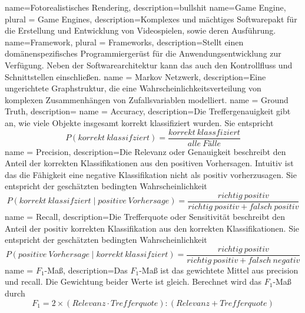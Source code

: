 {
  name=Fotorealistisches Rendering,
  description={bullshit}
}
{
  name=Game Engine,
  plural = {Game Engines},
  description={Komplexes und mächtiges Softwarepakt für die Erstellung und Entwicklung von Videospielen, sowie deren Ausführung.}
}
{
  name=Framework,
  plural = {Frameworks},
  description={Stellt einen domänenspezifisches Programmiergerüst für die Anwendungsentwicklung zur Verfügung. Neben der Softwarearchitektur kann das auch den Kontrollfluss und Schnittstellen einschließen.}
}
{
  name = {Markov Netzwerk},
  description={Eine ungerichtete Graphstruktur, die eine Wahrscheinlichkeitsverteilung von komplexen Zusammenhängen von Zufallsvariablen modelliert.}
}
{
  name = {Ground Truth},
  description={\todo{}}
}
{
  name = {Accuracy},
  description={Die Treffergenauigkeit gibt an, wie viele Objekte insgesamt korrekt klassifiziert wurden. Sie entspricht \begin{displaymath}
P(korrekt\ klassifziert) = \frac{korrekt\ klassfiziert}{alle\ Fälle} 
\end{displaymath}}
}
{
  name = {Precision},
  description={Die Relevanz oder Genauigkeit beschreibt den Anteil der korrekten Klassifikationen aus den positiven Vorhersagen. Intuitiv ist das die Fähigkeit eine negative Klassifikation nicht als positiv vorherzusagen. Sie entspricht der geschätzten bedingten Wahrscheinlichkeit \begin{displaymath}
P(korrekt\ klassifziert \mid positive\ Vorhersage) = \frac{richtig\ positiv}{richtig\ positiv + falsch\ positiv}
\end{displaymath}}
}
{
  name = {Recall},
  description={Die Trefferquote oder Sensitivität beschreibt den Anteil der positiv korrekten Klassifikation aus den korrekten Klassifikationen. Sie entspricht der geschätzten bedingten Wahrscheinlichkeit \begin{displaymath}
P(positive\ Vorhersage \mid korrekt\ klassifziert) = \frac{richtig\ positiv}{richtig\ positiv + falsch\ negativ}
\end{displaymath}}
}
{
  name = {$F_1$-Maß},
  description={Das $F_1$-Maß ist das gewichtete Mittel aus \gls{precision} und \gls{recall}. Die Gewichtung beider Werte ist gleich. Berechnet wird das $F_1$-Maß durch
\begin{displaymath}
F_1 = 2 \times (Relevanz \cdot Trefferquote) : (Relevanz + Trefferquote)
\end{displaymath}}
}
